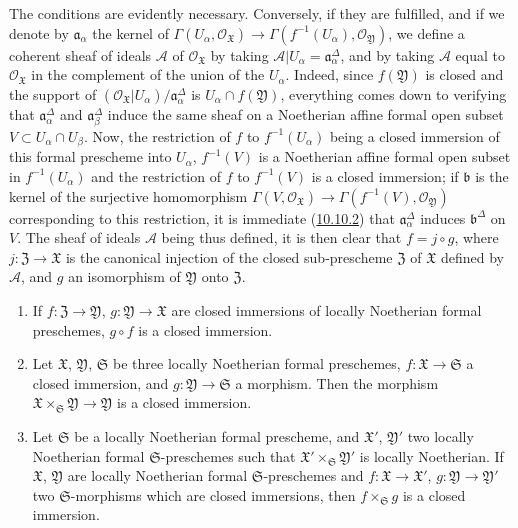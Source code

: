 The conditions are evidently necessary. Conversely, if they are
fulfilled, and if we denote by $\mathfrak{a}_\alpha$ the kernel of
$\Gamma(U_\alpha,\mathscr{O}_{\mathfrak{X}})\to
\Gamma(f^{-1}(U_\alpha),\mathscr{O}_{\mathfrak{Y}})$, we define a coherent
sheaf of ideals $\mathscr{A}$ of $\mathscr{O}_{\mathfrak{X}}$ by taking
$\mathscr{A}|U_\alpha=\mathfrak{a}_\alpha^\Delta$, and by taking $\mathscr{A}$
equal to $\mathscr{O}_{\mathfrak{X}}$ in the complement of the union of the
$U_\alpha$. Indeed, since
$f(\mathfrak{Y})$ is closed and the support of
$(\mathscr{O}_{\mathfrak{X}}|U_\alpha)/\mathfrak{a}_\alpha^\Delta$ is
$U_\alpha\cap f(\mathfrak{Y})$, everything comes down
to verifying that $\mathfrak{a}_\alpha^\Delta$ and
$\mathfrak{a}_\beta^\Delta$ induce the same sheaf on a Noetherian affine
formal open subset $V\subset U_\alpha\cap U_\beta$. Now, the restriction of
$f$ to $f^{-1}(U_\alpha)$ being a closed immersion of this formal prescheme
into $U_\alpha$, $f^{-1}(V)$ is a Noetherian affine formal open subset in
$f^{-1}(U_\alpha)$ and the restriction of $f$ to $f^{-1}(V)$ is a closed
immersion; if $\mathfrak{b}$ is the kernel of the surjective homomorphism
$\Gamma(V,\mathscr{O}_{\mathfrak{X}})\to
\Gamma(f^{-1}(V),\mathscr{O}_{\mathfrak{Y}})$ corresponding to this
restriction, it is immediate (\hyperref[I.10.10.2]{10.10.2}) that
$\mathfrak{a}_\alpha^\Delta$ induces $\mathfrak{b}^\Delta$ on $V$. The sheaf
of ideals $\mathscr{A}$ being thus defined, it is then clear that
$f=j\circ g$, where $j:\mathfrak{Z}\to\mathfrak{X}$ is the canonical injection
of the closed sub-prescheme $\mathfrak{Z}$ of $\mathfrak{X}$ defined by
$\mathscr{A}$, and $g$ an isomorphism of $\mathfrak{Y}$ onto $\mathfrak{Z}$.

\begin{proposition}[10.14.5]
\label{I.10.14.5}
\begin{enumerate}
  \item[\rm{(i)}] If $f:\mathfrak{Z}\to\mathfrak{Y}$,
  $g:\mathfrak{Y}\to\mathfrak{X}$ are closed immersions of locally
  Noetherian formal preschemes, $g\circ f$ is a closed immersion.

  \item[\rm{(ii)}] Let $\mathfrak{X}$, $\mathfrak{Y}$, $\mathfrak{S}$ be three
  locally Noetherian formal preschemes,
  $f:\mathfrak{X}\to\mathfrak{S}$ a closed immersion, and
  $g:\mathfrak{Y}\to\mathfrak{S}$ a morphism. Then the morphism
  $\mathfrak{X}\times_{\mathfrak{S}}\mathfrak{Y}\to\mathfrak{Y}$ is a
  closed immersion.
  \item[\rm{(iii)}] Let $\mathfrak{S}$ be a locally Noetherian formal
  prescheme, and $\mathfrak{X}'$, $\mathfrak{Y}'$ two locally Noetherian
  formal $\mathfrak{S}$-preschemes such that
  $\mathfrak{X}'\times_{\mathfrak{S}}\mathfrak{Y}'$ is locally
  Noetherian. If $\mathfrak{X}$, $\mathfrak{Y}$ are locally Noetherian
  formal $\mathfrak{S}$-preschemes and
  $f:\mathfrak{X}\to\mathfrak{X}'$, $g:\mathfrak{Y}\to\mathfrak{Y}'$ two
  $\mathfrak{S}$-morphisms which are closed immersions, then
  $f\times_{\mathfrak{S}}g$ is a closed immersion.
\end{enumerate}
\end{proposition}

